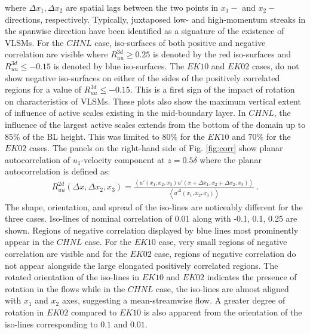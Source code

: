where $\Delta x_1, \Delta x_2$ are spatial lags between the two points in $x_1-$ and $x_2-$directions, respectively. Typically,  juxtaposed low- and high-momentum streaks  in the spanwise direction have been identified as a signature of the existence of VLSMs. For the $CHNL$ case, iso-surfaces of both positive and negative correlation are visible where $R_{uu}^{3d}\geq 0.25$ is denoted by the red iso-surfaces and $R_{uu}^{3d}\leq -0.15$ is denoted by blue iso-surfaces. The $EK10$ and $EK02$ cases, do not show negative iso-surfaces on either of the sides of the positively correlated regions for a value of $R_{uu}^{3d}\leq -0.15$. This is a  first sign of the impact of rotation on characteristics of VLSMs. These plots also show the maximum vertical extent of influence of active scales existing in the mid-boundary layer. In $CHNL$, the influence of the largest active scales extends from the bottom of the domain up to   $85\%$ of the BL height. This was limited to $80\%$ for the $EK10$ and $70\%$ for the $EK02$ cases.  The panels on the right-hand side of Fig. \ref{fig:corr} show planar autocorrelation of $u_1$-velocity component at $ z=0.5\delta$ where the planar autocorrelation is defined as: 
\begin{align}
 R_{uu}^{2d}(\Delta x, \Delta x_2, x_3)=\frac{\left < u'(x_1, x_2, x_3)u'(x+ \Delta x_1, x_2 + \Delta x_2, x_3) \right >}{\left < u'^{2}(x_1,x_2,x_3)\right >} \ .
 \label{eqn:2d_corr}
\end{align}
The shape, orientation, and spread of the iso-lines are noticeably different for the three cases. Iso-lines of nominal correlation of 0.01 along with -0.1, 0.1, 0.25 are shown. Regions of negative correlation displayed by blue lines most prominently appear in  the $CHNL$ case. For the $EK10$ case, very small regions of negative correlation are visible and for the $EK02$ case, regions of negative correlation do not appear alongside the large elongated positively correlated regions. The rotated orientation of the iso-lines in $EK10$ and $EK02$ indicates  the presence of rotation in the flows while in the $CHNL$ case, the iso-lines are almost aligned with $x_1$ and $x_2$ axes, suggesting  a mean-streamwise flow. A greater degree of rotation in $EK02$ compared to $EK10$ is also apparent from the orientation of the iso-lines corresponding to $0.1$ and $0.01$.  

